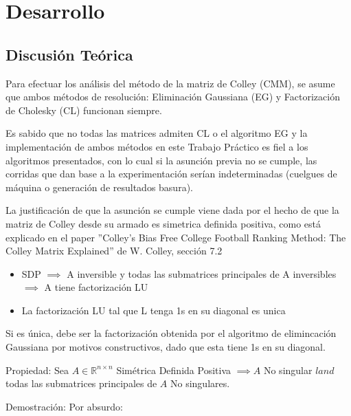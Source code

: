 \section{Desarrollo}

\subsection{Discusión Teórica}

Para efectuar los análisis del método de la matriz de Colley (CMM), se asume que ambos métodos de resolución: Eliminación Gaussiana (EG) y Factorización de Cholesky (CL) funcionan siempre. 

Es sabido que no todas las matrices admiten CL o el algoritmo EG y la implementación de ambos métodos en este Trabajo Práctico es fiel a los algoritmos presentados, con lo cual si la asunción previa no se cumple, las corridas que dan base a la experimentación serían indeterminadas (cuelgues de máquina o generación de resultados basura).

La justificación de que la asunción se cumple viene dada por el hecho de que la matriz de Colley desde su armado es simetrica definida positiva, como está explicado en el paper ''Colley's Bias Free College Football Ranking Method: The Colley Matrix Explained''  de W. Colley, sección 7.2

\begin{itemize}

\item SDP $\implies$ A inversible y todas las submatrices principales de A inversibles $\implies$ A tiene factorización LU

\item La factorización LU tal que L tenga 1s en su diagonal es unica

\end{itemize}

Si es única, debe ser la factorización obtenida por el algoritmo de elimincación Gaussiana por motivos constructivos, dado que esta tiene 1s en su diagonal.

\vspace{1em}

Propiedad: Sea \(A \in \mathbb{R}^{n \times n}\) Simétrica Definida Positiva \(\implies A\) No singular $land$ todas las submatrices principales de $A$ No singulares.

Demostración: Por absurdo:


